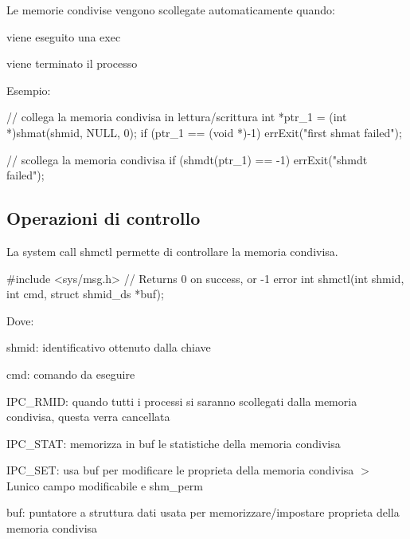 Le memorie condivise vengono scollegate automaticamente quando\+:
\begin{DoxyItemize}
\item viene eseguito una exec
\item viene terminato il processo
\end{DoxyItemize}

Esempio\+: 
\begin{DoxyCode}
\textcolor{comment}{// collega la memoria condivisa in lettura/scrittura}
\textcolor{keywordtype}{int} *ptr\_1 = (\textcolor{keywordtype}{int} *)shmat(shmid, NULL, 0);
\textcolor{keywordflow}{if} (ptr\_1 == (\textcolor{keywordtype}{void} *)-1)
    errExit(\textcolor{stringliteral}{"first shmat failed"});

\textcolor{comment}{// scollega la memoria condivisa}
\textcolor{keywordflow}{if} (shmdt(ptr\_1) == -1)
    errExit(\textcolor{stringliteral}{"shmdt failed"});
\end{DoxyCode}


\subsection*{Operazioni di controllo}

La system call {\ttfamily shmctl} permette di controllare la memoria condivisa.


\begin{DoxyCode}
\textcolor{preprocessor}{#include <sys/msg.h>}
\textcolor{comment}{// Returns 0 on success, or -1 error}
\textcolor{keywordtype}{int} shmctl(\textcolor{keywordtype}{int} shmid, \textcolor{keywordtype}{int} cmd, \textcolor{keyword}{struct} shmid\_ds *buf);
\end{DoxyCode}


Dove\+:
\begin{DoxyItemize}
\item {\ttfamily shmid}\+: identificativo ottenuto dalla chiave
\item {\ttfamily cmd}\+: comando da eseguire
\begin{DoxyItemize}
\item {\ttfamily I\+P\+C\+\_\+\+R\+M\+ID}\+: quando tutti i processi si saranno scollegati dalla memoria condivisa, questa verra\textquotesingle{} cancellata
\item {\ttfamily I\+P\+C\+\_\+\+S\+T\+AT}\+: memorizza in {\ttfamily buf} le statistiche della memoria condivisa
\item {\ttfamily I\+P\+C\+\_\+\+S\+ET}\+: usa {\ttfamily buf} per modificare le proprieta\textquotesingle{} della memoria condivisa $>$ L\textquotesingle{}unico campo modificabile e\textquotesingle{} {\ttfamily shm\+\_\+perm}
\end{DoxyItemize}
\item {\ttfamily buf}\+: puntatore a struttura dati usata per memorizzare/impostare proprieta\textquotesingle{} della memoria condivisa
\end{DoxyItemize}


